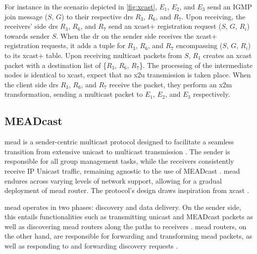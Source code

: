 For instance in the scenario depicted in \autoref{fig:xcast}, $E_1$, $E_2$, and
    $E_3$ send an IGMP join message ($S$, $G$) to their respective \glspl{dr}
    $R_3$, $R_6$, and $R_7$.
Upon receiving, the receivers' side \glspl{dr} $R_3$, $R_6$, and $R_7$ send an
    \gls{xcast+} registration request ($S$, $G$, $R_i$) towards sender $S$.
When the \gls{dr} on the sender side receives the \gls{xcast+} registration
    requests, it adds a tuple for $R_3$, $R_6$, and $R_7$ encompassing ($S$,
    $G$, $R_i$) to its \gls{xcast+} table.
Upon receiving multicast packets from $S$, $R_1$ creates an \gls{xcast} packet
    with a destination list of \{$R_3$, $R_6$, $R_7$\}.
The processing of the intermediate nodes is identical to \gls{xcast}, expect 
    that no \gls{x2u} transmission is taken place.
When the client side \glspl{dr} $R_3$, $R_6$, and $R_7$ receive the packet, 
    they perform an \gls{x2m} transformation, sending a multicast packet to
    $E_1$, $E_2$, and $E_3$ respectively.


\subsection{MEADcast} %
\label{sub:MEADcast}
\gls{mead} is a sender-centric multicast protocol designed to facilitate a
    seamless transition from extensive unicast to multicast transmission
    \cite{meadcast2}.
The sender is responsible for all group management tasks, while the receivers
    consistently receive IP Unicast traffic, remaining agnostic to the use
    of MEADcast \cite{meadcast1}.
\gls{mead} endures across varying levels of network support, allowing for a
    gradual deployment of \gls{mead} router.
The protocol's design draws inspiration from \gls{xcast} \cite{meadcast1}.

\gls{mead} operates in two phases: discovery and data delivery.
On the sender side, this entails functionalities such as transmitting unicast
    and MEADcast packets as well as discovering \gls{mead} routers along the
    paths to receivers \cite{meadcast2}.
\gls{mead} routers, on the other hand, are responsible for forwarding and
    transforming \gls{mead} packets, as well as responding to and forwarding
    discovery requests \cite{meadcast2}.

